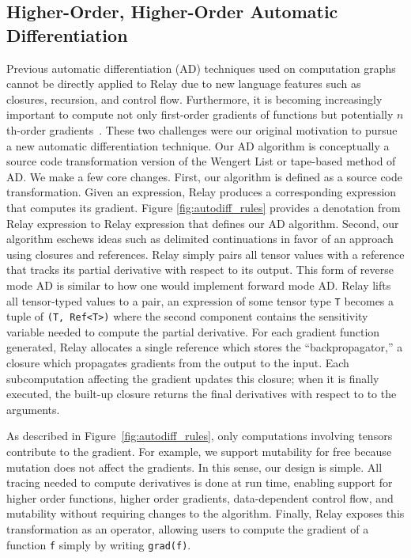 \subsection{Higher-Order, Higher-Order Automatic Differentiation}
\label{sec:autodiff}

Previous automatic differentiation (AD) techniques used on
  computation graphs cannot be directly applied to Relay due to new
  language features such as closures, recursion, and control flow.
Furthermore, it is becoming increasingly important to compute not
  only first-order gradients of functions
  but potentially $n$th-order gradients~\citep{neural_ode, darts}.
These two challenges were our original motivation to pursue
  a new automatic differentiation technique.
Our AD algorithm is conceptually a source code transformation
  version of the Wengert List or tape-based method of AD.
We make a few core changes.
First, our algorithm is defined as a source code
  transformation.
Given an expression, Relay produces a corresponding
  expression that computes its gradient.
Figure \ref{fig:autodiff_rules} provides a denotation from
  Relay expression to Relay expression that defines our
  AD algorithm.
Second, our algorithm eschews ideas such as delimited continuations
  in favor of an approach using closures and references.
Relay simply pairs all tensor values with a reference
  that tracks its partial derivative with respect to its
  output.
This form of reverse mode AD is similar to how one
  would implement forward mode AD.
Relay lifts all tensor-typed values to a pair,
  an expression of some tensor type \verb|T| becomes a tuple of \verb|(T, Ref<T>)|
  where the second component contains the sensitivity variable
  needed to compute the partial derivative.
For each gradient function generated, Relay allocates
  a single reference which stores the ``backpropagator,''
  a closure which propagates gradients from the output to the input.
Each subcomputation affecting the gradient updates this closure; when it is
  finally executed, the built-up closure returns the final derivatives with respect to
  to the arguments.

As described in Figure~\ref{fig:autodiff_rules}, only
  computations involving tensors contribute to the gradient.
For example, we support mutability for free because mutation
  does not affect the gradients.
In this sense, our design is simple.
All tracing needed to compute derivatives is done at run time, enabling
  support for higher order functions, higher order gradients,
  data-dependent control flow, and mutability without requiring changes
  to the algorithm.
Finally, Relay exposes this transformation as an operator, allowing users
  to compute the gradient of a function \verb|f| simply by writing \verb|grad(f)|.

